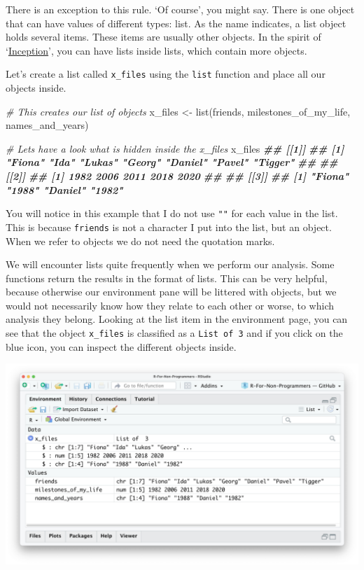 \documentclass[
]{book}
\newenvironment{Shaded}{\begin{snugshade}}{\end{snugshade}}
\newcommand{\CommentTok}[1]{\textcolor[rgb]{0.56,0.35,0.01}{\textit{#1}}}
\newcommand{\DocumentationTok}[1]{\textcolor[rgb]{0.56,0.35,0.01}{\textbf{\textit{#1}}}}
\newcommand{\FunctionTok}[1]{\textcolor[rgb]{0.00,0.00,0.00}{#1}}
\newcommand{\NormalTok}[1]{#1}
\newcommand{\OtherTok}[1]{\textcolor[rgb]{0.56,0.35,0.01}{#1}}
\begin{document}
There is an exception to this rule. `Of course', you might say. There is one object that can have values of different types: list. As the name indicates, a list object holds several items. These items are usually other objects. In the spirit of `\href{https://www.imdb.com/title/tt1375666/?ref_=ext_shr_lnk}{Inception}', you can have lists inside lists, which contain more objects.

Let's create a list called \texttt{x\_files} using the \texttt{list} function and place all our objects inside.

\begin{Shaded}
\begin{Highlighting}[]
\CommentTok{\# This creates our list of objects}
\NormalTok{x\_files }\OtherTok{\textless{}{-}} \FunctionTok{list}\NormalTok{(friends,}
\NormalTok{               milestones\_of\_my\_life,}
\NormalTok{               names\_and\_years)}

\CommentTok{\# Let\textquotesingle{}s have a look what is hidden inside the x\_files}
\NormalTok{x\_files}
\DocumentationTok{\#\# [[1]]}
\DocumentationTok{\#\# [1] "Fiona"  "Ida"    "Lukas"  "Georg"  "Daniel" "Pavel"  "Tigger"}
\DocumentationTok{\#\# }
\DocumentationTok{\#\# [[2]]}
\DocumentationTok{\#\# [1] 1982 2006 2011 2018 2020}
\DocumentationTok{\#\# }
\DocumentationTok{\#\# [[3]]}
\DocumentationTok{\#\# [1] "Fiona"  "1988"   "Daniel" "1982"}
\end{Highlighting}
\end{Shaded}

You will notice in this example that I do not use \texttt{""} for each value in the list. This is because \texttt{friends} is not a character I put into the list, but an object. When we refer to objects we do not need the quotation marks.

We will encounter lists quite frequently when we perform our analysis. Some functions return the results in the format of lists. This can be very helpful, because otherwise our environment pane will be littered with objects, but we would not necessarily know how they relate to each other or worse, to which analysis they belong. Looking at the list item in the environment page, you can see that the object \texttt{x\_files} is classified as a \texttt{List\ of\ 3} and if you click on the blue icon, you can inspect the different objects inside.

\includegraphics{images/chapter_05_img/02_basic_computation_environment_lists.png}
\end{document}
